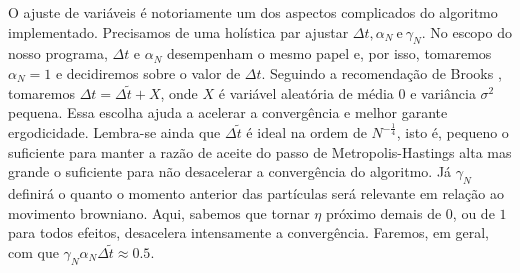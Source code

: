 \documentclass[12pt]{report}
\begin{document}
O ajuste de variáveis é notoriamente um dos aspectos complicados do algoritmo implementado. Precisamos de uma holística par ajustar $\Delta t, \alpha_N \ \text{e} \ \gamma_N$. No escopo do nosso programa, $\Delta t$ e $\alpha_N$ desempenham o mesmo papel e, por isso, tomaremos $\alpha_N = 1$ e decidiremos sobre o valor de $\Delta t$. Seguindo a recomendação de Brooks \cite[Capítulo~5]{handbookmontecarlo}, tomaremos $\Delta t = \Delta\tilde{t} + X$, onde $X$ é variável aleatória de média $0$ e variância $\sigma^2$ pequena. Essa escolha ajuda a acelerar a convergência e melhor garante ergodicidade. Lembra-se ainda que $\Delta \tilde{t}$ é ideal na ordem de $N^{-\frac{1}{4}}$, isto é,  pequeno o suficiente para manter a razão de aceite do passo de Metropolis-Hastings alta mas grande o suficiente para não desacelerar a convergência do algoritmo. Já $\gamma_N$ definirá o quanto o momento anterior das partículas será relevante em relação ao movimento browniano. Aqui, sabemos que tornar $\eta$ próximo demais de $0$, ou de $1$ para todos efeitos, desacelera intensamente a convergência. Faremos, em geral, com que $\gamma_N \alpha_N \Delta \tilde{t} \approx 0.5$.
\end{document}

